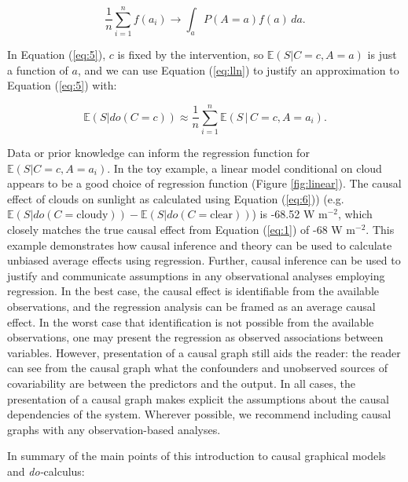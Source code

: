 \documentclass[12pt]{article}
\begin{document}
\begin{equation}
  \frac{1}{n} \sum_{i=1}^n f(a_i) \to \int_a P(A=a) f(a) \, d a.
  \label{eq:lln}
\end{equation}

In Equation (\ref{eq:5}), $c$ is fixed by the intervention, so
$\mathbb{E}(S| C=c, A=a)$ is just a function of $a$, and we can use
Equation (\ref{eq:lln}) to justify an approximation to Equation
(\ref{eq:5}) with:

\begin{equation}
  \mathbb{E}(S | do(C = c))  \approx \frac{1}{n} \sum_{i=1}^n
  \mathbb{E}(S \, | \,
  C=c, A=a_i).
  \label{eq:6}
\end{equation}

Data or prior knowledge can inform the regression function for
$\mathbb{E}(S | C=c, A=a_i)$. In the toy example, a linear model
conditional on cloud appears to be a good choice of regression
function (Figure \ref{fig:linear}). The causal effect of clouds on
sunlight as calculated using Equation (\ref{eq:6})) (e.g.
$\mathbb{E}(S | do(C = \text{cloudy})) - \mathbb{E}(S | do(C =
\text{clear}))$) is -68.52 W m$^{-2}$, which closely matches the true
causal effect from Equation (\ref{eq:1}) of -68 W m$^{-2}$. This
example demonstrates how causal inference and theory can be used to
calculate unbiased average effects using regression. Further, causal
inference can be used to justify and communicate assumptions in any
observational analyses employing regression. In the best case, the
causal effect is identifiable from the available observations, and the
regression analysis can be framed as an average causal effect. In the
worst case that identification is not possible from the available
observations, one may present the regression as observed associations
between variables. However, presentation of a causal graph still aids
the reader: the reader can see from the causal graph what the
confounders and unobserved sources of covariability are between the
predictors and the output. In all cases, the presentation of a causal
graph makes explicit the assumptions about the causal dependencies of
the system. Wherever possible, we recommend including causal graphs
with any observation-based analyses.

In summary of the main points of this introduction to causal graphical
models and \textit{do-}calculus:
\end{document}
